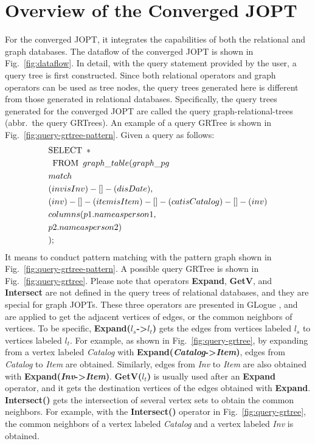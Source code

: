 \documentclass[sigconf, nonacm]{acmart}
\begin{document}
\section{Overview of the Converged JOPT}
\label{sec:overview}
For the converged JOPT, it integrates the capabilities of both the relational and graph databases.
The dataflow of the converged JOPT is shown in Fig.~\ref{fig:dataflow}.
In detail, with the query statement provided by the user, a query tree is first constructed.
Since both relational operators and graph operators can be used as tree nodes, the query trees generated here is different from those generated in relational databases.
Specifically, the query trees generated for the converged JOPT are called the query graph-relational-trees (abbr.~the query GRTrees).
An example of a query GRTree is shown in Fig.~\ref{fig:query-grtree-pattern}.
Given a query as follows:
\begin{equation*}
    \begin{split}
        & \text{SELECT}\hspace{.5em} * \\ 
        & \hspace{.5em}\text{FROM}\hspace{.5em} graph\_table (graph\_pg \\
        & match \\
        & (inv is Inv) -[]- (d is Date), \\
        & (inv)-[]-(item is Item)-[]-(cat is Catalog)-[]-(inv) \\
        & columns (p1.name as person1,\\
        &     p2.name as person2)\\
        & );
    \end{split}
\end{equation*}
It means to conduct pattern matching with the pattern graph shown in Fig.~\ref{fig:query-grtree-pattern}.
A possible query GRTree is shown in Fig.~\ref{fig:query-grtree}.
Please note that operators \textbf{Expand}, \textbf{GetV}, and \textbf{Intersect} are not defined in the query trees of relational databases, and they are special for graph JOPTs.
These three operators are presented in GLogue \cite{GLogS}, and are applied to get the adjacent vertices of edges, or the common neighbors of vertices.
To be specific, \textbf{Expand($l_s$->$l_t$)} gets the edges from vertices labeled \textit{$l_s$} to vertices labeled \textit{$l_t$}.
For example, as shown in Fig.~\ref{fig:query-grtree}, by expanding from a vertex labeled \textit{Catalog} with \textbf{Expand(\textit{Catalog}->\textit{Item})}, edges from \textit{Catalog} to \textit{Item} are obtained.
Similarly, edges from \textit{Inv} to \textit{Item} are also obtained with \textbf{Expand(\textit{Inv}->\textit{Item})}.
\textbf{GetV($l_t$)} is usually used after an \textbf{Expand} operator, and it gets the destination vertices of the edges obtained with \textbf{Expand}. 
\textbf{Intersect()} gets the intersection of several vertex sets to obtain the common neighbors.
For example, with the \textbf{Intersect()} operator in Fig.~\ref{fig:query-grtree}, the common neighbors of a vertex labeled \textit{Catalog} and a vertex labeled \textit{Inv} is obtained.
\end{document}
